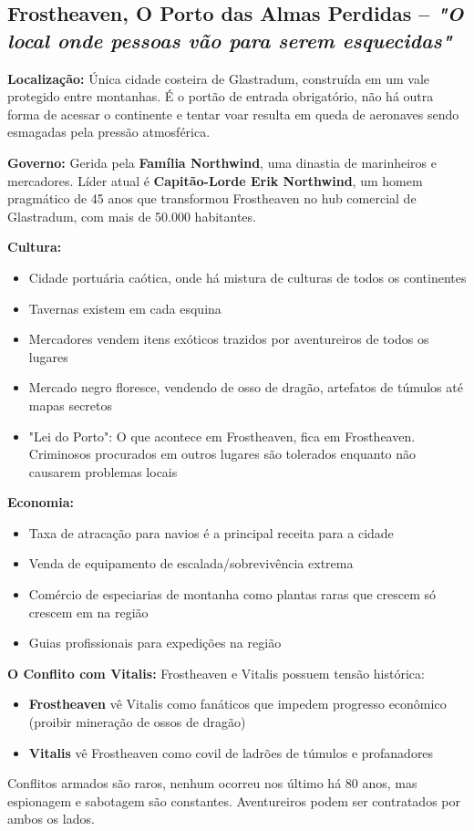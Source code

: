 \subsection*{Frostheaven, O Porto das Almas Perdidas – \textit{"O local onde pessoas vão para serem esquecidas"}}

\textbf{\ringmfamily Localização:} Única cidade costeira de Glastradum, construída em um vale protegido entre montanhas. É o portão de entrada obrigatório, não há outra forma de acessar o continente e tentar voar resulta em queda de aeronaves sendo esmagadas pela pressão atmosférica.

\textbf{\ringmfamily Governo:} Gerida pela \textbf{Família Northwind}, uma dinastia de marinheiros e mercadores. Líder atual é \textbf{Capitão-Lorde Erik Northwind}, um homem pragmático de 45 anos que transformou Frostheaven no hub comercial de Glastradum, com mais de 50.000 habitantes.

\textbf{\ringmfamily Cultura:}
\begin{itemize}
    \item Cidade portuária caótica, onde há mistura de culturas de todos os continentes
    \item Tavernas existem em cada esquina 
    \item Mercadores vendem itens exóticos trazidos por aventureiros de todos os lugares
    \item Mercado negro floresce, vendendo de osso de dragão, artefatos de túmulos até mapas secretos
    \item "Lei do Porto": O que acontece em Frostheaven, fica em Frostheaven. Criminosos procurados em outros lugares são tolerados enquanto não causarem problemas locais
\end{itemize}

\textbf{\ringmfamily Economia:}
\begin{itemize}
    \item Taxa de atracação para navios é a principal receita para a cidade
    \item Venda de equipamento de escalada/sobrevivência extrema
    \item Comércio de especiarias de montanha como plantas raras que crescem só crescem em na região
    \item Guias profissionais para expedições na região
\end{itemize}

\textbf{\ringmfamily O Conflito com Vitalis:}
Frostheaven e Vitalis possuem tensão histórica:
\begin{itemize}
    \item \textbf{Frostheaven} vê Vitalis como fanáticos que impedem progresso econômico (proibir mineração de ossos de dragão)
    \item \textbf{Vitalis} vê Frostheaven como covil de ladrões de túmulos e profanadores
\end{itemize}
Conflitos armados são raros, nenhum ocorreu nos último há 80 anos, mas espionagem e sabotagem são constantes. Aventureiros podem ser contratados por ambos os lados.

